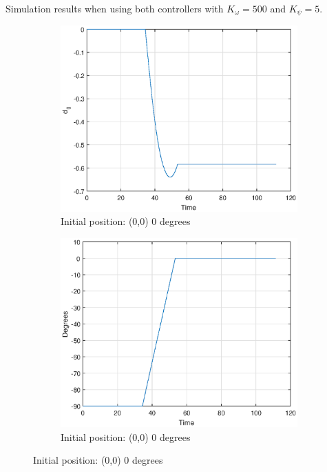 Simulation results when using both controllers with $K_\omega=500$ and $K_\psi=5$. 
\begin{figure}[H]
    \centering
    
    \begin{subfigure}[b]{6cm}
        \includegraphics[width=\textwidth]{task_9_500_d0_initial_000_Goal_2090.eps}
        \caption{Initial position: (0,0) 0 degrees}
        \label{fig:d0002090}
    \end{subfigure}
    \begin{subfigure}[b]{6cm}
        \includegraphics[width=\textwidth]{task_9_500_deg_initial_000_Goal_2090.eps}
        \caption{Initial position: (0,0) 0 degrees}
        \label{fig:deg0002090}
    \end{subfigure}
   

\end{figure}

